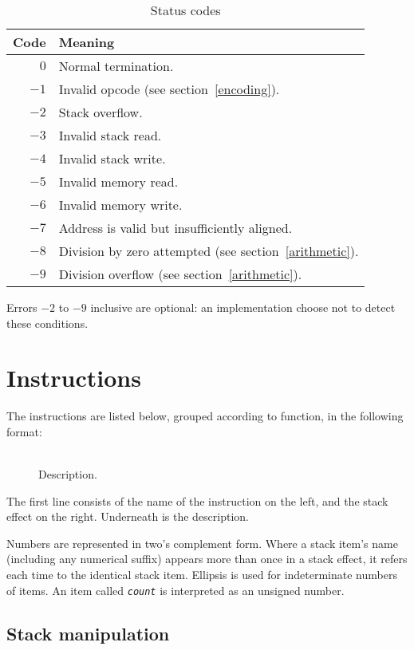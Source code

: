 \documentclass[a4paper]{article}
\newcommand{\spic}[1]{\texttt{\slshape{#1\/}}}
\newlength{\itemwidth}\itemwidth=\textwidth \advance\itemwidth by -0.1in
\newlength{\instname}\instname=0.8in
\newlength{\stackcom}\stackcom=3.7in
\newcommand{\inst}[3]{\item[]\parbox{\itemwidth}%
{\makebox[\instname][l]{\tt #1}%
\makebox[\stackcom][r]{\spic{#2}}\\[0.5ex]#3}}
\begin{document}
\begin{table}[htb]
\begin{center}
\begin{tabular}{rp{4in}} \toprule
\bf Code & \bf Meaning \\ \midrule
$0$ & Normal termination. \\
$-1$ & Invalid opcode (see section~\ref{encoding}). \\
$-2$ & Stack overflow. \\
$-3$ & Invalid stack read. \\
$-4$ & Invalid stack write. \\
$-5$ & Invalid memory read. \\
$-6$ & Invalid memory write. \\
$-7$ & Address is valid but insufficiently aligned. \\
$-8$ & Division by zero attempted (see section~\ref{arithmetic}). \\
$-9$ & Division overflow (see section~\ref{arithmetic}). \\
 \bottomrule
\end{tabular}
\caption{\label{statustable}Status codes}
\end{center}
\end{table}

\noindent Errors $-2$ to $-9$ inclusive are optional: an implementation choose not to detect these conditions.


\section{Instructions}

The instructions are listed below, grouped according to function, in the following format:

\begin{description}
\inst{NAME}{before → after}{Description.}
\end{description}

\noindent The first line consists of the name of the instruction on the left, and the stack effect on the right. Underneath is the description.

Numbers are represented in two’s complement form. Where a stack item’s name (including any numerical suffix) appears more than once in a stack effect, it refers each time to the identical stack item. Ellipsis is used for indeterminate numbers of items. An item called \spic{count} is interpreted as an unsigned number.


\subsection{Stack manipulation}
\end{document}
